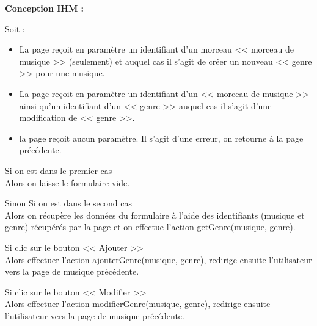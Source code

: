 			\begin{paragraphe}
				\textbf{Conception IHM :}
			\end{paragraphe}

			\begin{paragraphe}
				Soit :
				\begin{itemize}
					\item La page reçoit en paramètre un identifiant d'un morceau << morceau de musique >> (seulement) et auquel cas il s'agit de créer un nouveau << genre >> pour une musique.
					\item La page reçoit en paramètre un identifiant d'un << morceau de musique >> ainsi qu'un identifiant d'un << genre >> auquel cas il s'agit d'une modification de << genre >>.
					\item la page reçoit aucun paramètre. Il s'agit d'une erreur, on retourne à la page précédente.
				\end{itemize}
			\end{paragraphe}


			\begin{paragraphe}
				Si on est dans le premier cas \\
				Alors on laisse le formulaire vide.
			\end{paragraphe}

			\begin{paragraphe}
				Sinon Si on est dans le second cas \\
				Alors on récupère les données du formulaire à l'aide des identifiants (musique et genre) récupérés par la page et on effectue l'action getGenre(musique, genre).
			\end{paragraphe}

			\begin{paragraphe}
				Si clic sur le bouton << Ajouter >> \\
				Alors effectuer l'action ajouterGenre(musique, genre), redirige ensuite l'utilisateur vers la page de musique précédente.
			\end{paragraphe}

			\begin{paragraphe}
				Si clic sur le bouton << Modifier >> \\
				Alors effectuer l'action modifierGenre(musique, genre), redirige ensuite l'utilisateur vers la page de musique précédente.
			\end{paragraphe}

